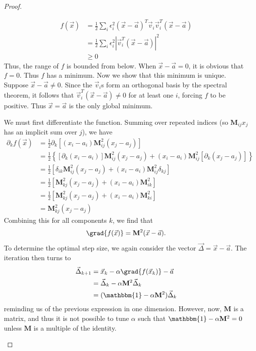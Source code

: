 \begin{proof}
\begin{parts}
\begin{align*}
	f(\vec x) &= \frac 12 \sum_i \epsilon_i^2(\vec x - \vec a)^T \vec v_i \vec v_i^T(\vec x - \vec a) \\
	&= \frac 12 \sum_i \epsilon_i^2 |\vec v_i^T(\vec x - \vec a)|^2\\
	&\ge 0
\end{align*}
Thus, the range of $f$ is bounded from below. When $\vec x - \vec a = 0$, it is obvious that $f=0$. Thus $f$ has a minimum. Now we show that this minimum is unique. Suppose $\vec x - \vec a \neq 0$. Since the $\vec v_i$s form an orthogonal basis by the spectral theorem, it follows that $\vec v_i^T (\vec x - \vec a)\neq 0$ for at least one $i$, forcing $f$ to be positive. Thus $\vec x=\vec a$ is the only global minimum.
\item We must first differentiate the function. Summing over repeated indices (so $\mathbf{M}_{ij}x_j$ has an implicit sum over $j$), we have
	\begin{align*}
		\partial_k f(\vec x) &= \frac{1}{2}\partial_k \left[ (x_i-a_i)\textbf{M}^2_{ij}(x_j-a_j) \right]  \\
				     &= \frac{1}{2}\left\{ [\partial_k (x_i-a_i)]\textbf{M}^2_{ij}(x_j-a_j)+(x_i-a_i)\textbf{M}^2_{ij}[\partial_k (x_j-a_j)] \right\}  \\
				     &= \frac{1}{2}\left[ \delta_{ik}\textbf{M}^2_{ij}(x_j-a_j) + (x_i-a_i)\textbf{M}^2_{ij}\delta_{kj} \right]  \\
				     &= \frac{1}{2}\left[ \textbf{M}^2_{kj}(x_j-a_j) + (x_i-a_i)\textbf{M}^2_{ik} \right]  \\
				     &= \frac{1}{2}\left[ \textbf{M}^2_{kj}(x_j-a_j) + (x_i-a_i)\textbf{M}^2_{ki} \right]  \\
				     &= \textbf{M}^2_{kj}(x_j-a_j)
	\end{align*}
	Combining this for all components $k$, we find that
	\[
		\grad{f(\vec x)} = \mathbf{M}^2 (\vec x - \vec a)
	.\] 
	To determine the optimal step size, we again consider the vector $\vec\Delta = \vec x - \vec a$. The iteration then turns to
	\begin{align*}
		\vec{\Delta}_{k+1} &= \vec x_k - \alpha \grad{f(\vec x_k)} -\vec a\\
				   &= \vec\Delta_k - \alpha \mathbf{M}^2 \vec \Delta_k \\
				   &= (\mathbbm{1} - \alpha \mathbf{M}^2)\vec\Delta_k 
	\end{align*}
	reminding us of the previous expression in one dimension. However, now, $\mathbf{M}$ is a matrix, and thus it is not possible to tune $\alpha$ such that $\mathbbm{1}-\alpha\mathbf{M}^2=0$ unless $\mathbf{M}$ is a multiple of the identity.


\end{parts}
\end{proof}
